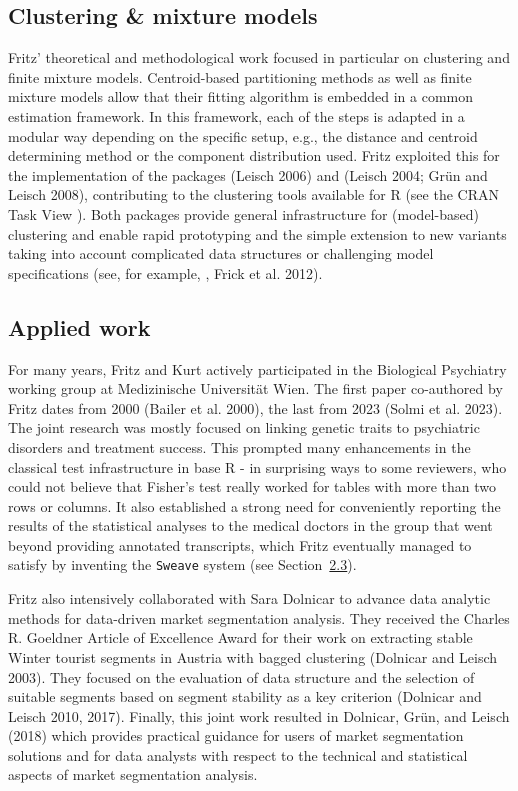 \hypertarget{clustering-mixture-models}{%
\subsection{Clustering \& mixture models}\label{clustering-mixture-models}}

Fritz' theoretical and methodological work focused in particular on
clustering and finite mixture models. Centroid-based partitioning
methods as well as finite mixture models allow that their fitting
algorithm is embedded in a common estimation framework. In this
framework, each of the steps is adapted in a modular way depending on
the specific setup, e.g., the distance and centroid determining method
or the component distribution used. Fritz exploited this for the
implementation of the packages  (Leisch 2006) and
 (Leisch 2004; Grün and Leisch 2008), contributing to
the clustering tools available for R (see the CRAN Task View
). Both packages provide general infrastructure for
(model-based) clustering and enable rapid prototyping and the simple
extension to new variants taking into account complicated data
structures or challenging model specifications (see, for example,
, Frick et al. 2012).

\hypertarget{applied-work}{%
\subsection{Applied work}\label{applied-work}}

For many years, Fritz and Kurt actively participated in the Biological
Psychiatry working group at Medizinische Universität Wien. The first
paper co-authored by Fritz dates from 2000
(Bailer et al. 2000), the last from 2023
(Solmi et al. 2023). The joint research was mostly
focused on linking genetic traits to psychiatric disorders and
treatment success. This prompted many enhancements in the classical test
infrastructure in base R - in surprising ways to some reviewers, who
could not believe that Fisher's test really worked for tables with more
than two rows or columns. It also established a strong need for
conveniently reporting the results of the statistical analyses to the
medical doctors in the group that went beyond providing annotated
transcripts, which Fritz eventually managed to satisfy by inventing the
\texttt{Sweave} system (see Section~\protect\hyperlink{sec:sweave-reproducibility}{2.3}).

Fritz also intensively collaborated with Sara Dolnicar to advance data
analytic methods for data-driven market segmentation analysis. They
received the Charles R. Goeldner Article of Excellence Award for their
work on extracting stable Winter tourist segments in Austria with
bagged clustering (Dolnicar and Leisch 2003). They focused on the
evaluation of data structure and the selection of suitable segments
based on segment stability as a key criterion (Dolnicar and Leisch 2010, 2017). Finally, this joint work resulted in
Dolnicar, Grün, and Leisch (2018) which provides practical guidance for
users of market segmentation solutions and for data analysts with
respect to the technical and statistical aspects of market
segmentation analysis.

